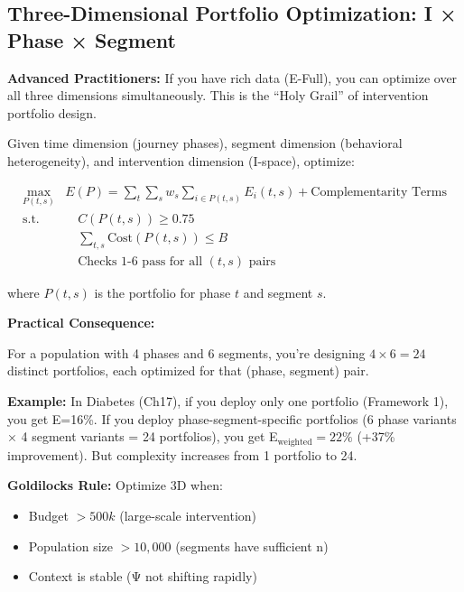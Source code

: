 \subsection{Three-Dimensional Portfolio Optimization: I × Phase × Segment}

\textbf{Advanced Practitioners:} If you have rich data (E-Full), you can optimize over all three dimensions simultaneously. This is the ``Holy Grail'' of intervention portfolio design.

\begin{definition}

Given time dimension (journey phases), segment dimension (behavioral heterogeneity), and intervention dimension (I-space), optimize:

\begin{align}
\max_{P(t,s)} & E(P) = \sum_{t} \sum_{s} w_s \sum_{i \in P(t,s)} E_i(t,s) + \text{Complementarity Terms} \\
\text{s.t.} & \quad C(P(t,s)) \geq 0.75 \\
& \quad \sum_{t,s} \text{Cost}(P(t,s)) \leq B \\
& \quad \text{Checks 1-6 pass for all } (t,s) \text{ pairs}
\end{align}

where $P(t,s)$ is the portfolio for phase $t$ and segment $s$.

\end{definition}

\textbf{Practical Consequence:}

For a population with 4 phases and 6 segments, you're designing $4 \times 6 = 24$ distinct portfolios, each optimized for that (phase, segment) pair.

\textbf{Example:} In Diabetes (Ch17), if you deploy only one portfolio (Framework 1), you get E=16\%. If you deploy phase-segment-specific portfolios (6 phase variants × 4 segment variants = 24 portfolios), you get E$_{\text{weighted}} = 22\%$ (+37\% improvement). But complexity increases from 1 portfolio to 24.

\textbf{Goldilocks Rule:} Optimize 3D when:
\begin{itemize}[nosep]
\item Budget $> 500k$ (large-scale intervention)
\item Population size $> 10,000$ (segments have sufficient n)
\item Context is stable (Ψ not shifting rapidly)
\end{itemize}


